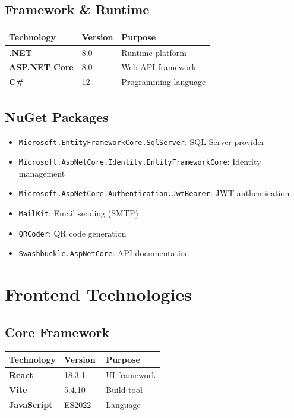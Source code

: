 \documentclass[11pt,a4paper]{report}
\begin{document}
\subsection{Framework \& Runtime}
\begin{tabular}{lll}
\toprule
\textbf{Technology} & \textbf{Version} & \textbf{Purpose} \\ \midrule
\textbf{.NET} & 8.0 & Runtime platform \\
\textbf{ASP.NET Core} & 8.0 & Web API framework \\
\textbf{C\#} & 12 & Programming language \\ \bottomrule
\end{tabular}

\subsection{NuGet Packages}
\begin{itemize}
    \item \texttt{Microsoft.EntityFrameworkCore.SqlServer}: SQL Server provider
    \item \texttt{Microsoft.AspNetCore.Identity.EntityFrameworkCore}: Identity management
    \item \texttt{Microsoft.AspNetCore.Authentication.JwtBearer}: JWT authentication
    \item \texttt{MailKit}: Email sending (SMTP)
    \item \texttt{QRCoder}: QR code generation
    \item \texttt{Swashbuckle.AspNetCore}: API documentation
\end{itemize}

\section{Frontend Technologies}
\subsection{Core Framework}
\begin{tabular}{lll}
\toprule
\textbf{Technology} & \textbf{Version} & \textbf{Purpose} \\ \midrule
\textbf{React} & 18.3.1 & UI framework \\
\textbf{Vite} & 5.4.10 & Build tool \\
\textbf{JavaScript} & ES2022+ & Language \\ \bottomrule
\end{tabular}
\end{document}
